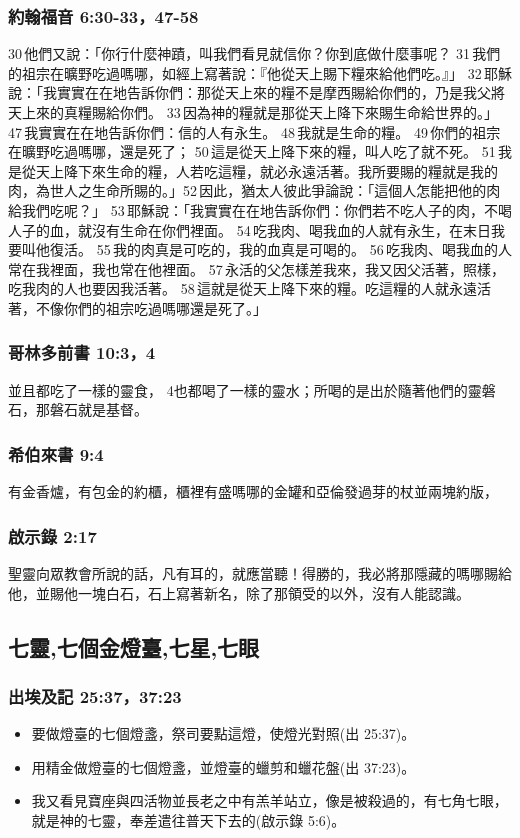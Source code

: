 \subsubsection{約翰福音 6:30-33，47-58}
30 他們又說：「你行什麼神蹟，叫我們看見就信你？你到底做什麼事呢？ 31 我們的祖宗在曠野吃過嗎哪，如經上寫著說：『他從天上賜下糧來給他們吃。』」 32 耶穌說：「我實實在在地告訴你們：那從天上來的糧不是摩西賜給你們的，乃是我父將天上來的真糧賜給你們。 33 因為神的糧就是那從天上降下來賜生命給世界的。」 47 我實實在在地告訴你們：信的人有永生。 48 我就是生命的糧。 49 你們的祖宗在曠野吃過嗎哪，還是死了； 50 這是從天上降下來的糧，叫人吃了就不死。 51 我是從天上降下來生命的糧，人若吃這糧，就必永遠活著。我所要賜的糧就是我的肉，為世人之生命所賜的。」52 因此，猶太人彼此爭論說：「這個人怎能把他的肉給我們吃呢？」 53 耶穌說：「我實實在在地告訴你們：你們若不吃人子的肉，不喝人子的血，就沒有生命在你們裡面。 54 吃我肉、喝我血的人就有永生，在末日我要叫他復活。 55 我的肉真是可吃的，我的血真是可喝的。 56 吃我肉、喝我血的人常在我裡面，我也常在他裡面。 57 永活的父怎樣差我來，我又因父活著，照樣，吃我肉的人也要因我活著。 58 這就是從天上降下來的糧。吃這糧的人就永遠活著，不像你們的祖宗吃過嗎哪還是死了。」

\subsubsection{哥林多前書 10:3，4}
並且都吃了一樣的靈食， 4也都喝了一樣的靈水；所喝的是出於隨著他們的靈磐石，那磐石就是基督。

\subsubsection{希伯來書 9:4}
有金香爐，有包金的約櫃，櫃裡有盛嗎哪的金罐和亞倫發過芽的杖並兩塊約版，

\subsubsection{啟示錄 2:17}
聖靈向眾教會所說的話，凡有耳的，就應當聽！得勝的，我必將那隱藏的嗎哪賜給他，並賜他一塊白石，石上寫著新名，除了那領受的以外，沒有人能認識。





\subsection{七靈,七個金燈臺,七星,七眼}
\subsubsection{出埃及記 25:37，37:23}
\begin{itemize} 
\itemsep-.25em
\item 要做燈臺的七個燈盞，祭司要點這燈，使燈光對照(出 25:37)。
\item 用精金做燈臺的七個燈盞，並燈臺的蠟剪和蠟花盤(出 37:23)。
\item 我又看見寶座與四活物並長老之中有羔羊站立，像是被殺過的，有七角七眼，就是神的七靈，奉差遣往普天下去的(啟示錄 5:6)。
\end{itemize} 

